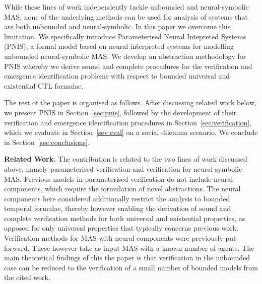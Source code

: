 While these lines of work independently tackle unbounded and neural-symbolic
MAS, none of the underlying methods can be used for analysis of systems that are
both unbounded and neural-symbolic.  In this paper we overcome this limitation.
We specifically introduce Parameterised Neural Intepreted Systems (PNIS), a
formal model based on neural interpreted systems for modelling unbounded
neural-symbolic MAS.  We develop an abstraction methodology for PNIS whereby we
derive sound and complete procedures for the verification and emergence
identification problems with respect to  bounded universal and existential CTL
formulae. 


The rest of the paper is organised as follows. After discussing related work
below, we present PNIS in Section~\ref{sec:pnis}, followed by the development of
their verification and emergence identification procedures in
Section~\ref{sec:verification}, which we evaluate in Section~\ref{sev:eval}  on
a social dilemma scenario. We conclude in Section~\ref{sec:conclusions}.


{\bf Related Work.}  The contribution is related to the two lines of work
discussed above, namely parameterised verification and verification for
neural-symbolic MAS. Previous models in parameterised verification do not
include neural components, which require the formulation of novel abstractions.
The neural components here considered additionally restrict the analysis to
bounded temporal formulae, thereby however enabling the derivation of sound and
complete verification methods for both universal and existential properties, as
opposed for only universal properties that typically concerns previous work.
Verification methods for MAS with neural components were previously put forward.
These however take as input MAS with a known number of agents. The main
theoretical findings of this  the paper is that verification in the unbounded
case can be reduced to the verification of a small number of bounded models from
the cited work.


